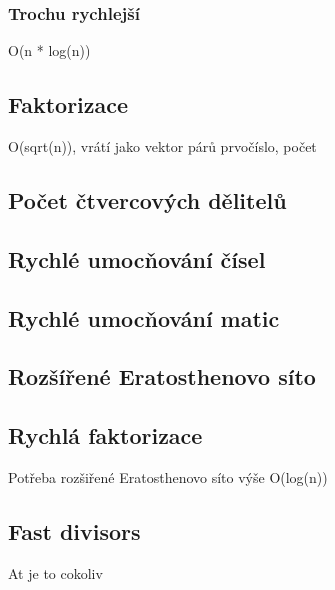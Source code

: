 \documentclass[10pt, a4paper]{article}
\begin{document}
\subsubsection{Trochu rychlejší}
O(n * log(n))


\subsection{Faktorizace}
O(sqrt(n)), vrátí jako vektor párů {prvočíslo, počet}


\subsection{Počet čtvercových dělitelů}


\subsection{Rychlé umocňování čísel}



\subsection{Rychlé umocňování matic}


\subsection{Rozšířené Eratosthenovo síto}


\subsection{Rychlá faktorizace}
Potřeba rozšiřené Eratosthenovo síto výše
O(log(n))


\subsection{Fast divisors}
At je to cokoliv

\end{document}
